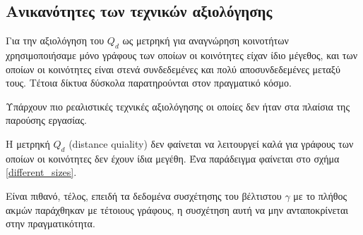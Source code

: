 \documentclass[12pt, letterpaper]{article}
\begin{document}
\subsection{Ανικανότητες των τεχνικών αξιολόγησης}

Για την αξιολόγηση του $Q_d$ ως μετρηκή για αναγνώρηση κοινοτήτων χρησιμοποιήσαμε 
μόνο γράφους των οποίων οι κοινότητες είχαν ίδιο μέγεθος, και των οποίων οι κοινότητες 
είναι στενά συνδεδεμένες και πολύ αποσυνδεδεμένες μεταξύ τους. 
Τέτοια δίκτυα δύσκολα παρατηρούνται στον πραγματικό κόσμο. 

Υπάρχουν πιο ρεαλιστικές τεχνικές αξιολόγησης \cite{benchmark_realistic} οι οποίες δεν 
ήταν στα πλαίσια της παρούσης εργασίας. 


Η μετρηκή $Q_d$ (\textlatin{distance quiality}) δεν φαίνεται να λειτουργεί καλά για γράφους
των οποίων οι κοινότητες δεν έχουν ίδια μεγέθη. 
Ένα παράδειγμα φαίνεται στο σχήμα \ref{different_sizes}.  

Είναι πιθανό, τέλος, επειδή τα δεδομένα συσχέτησης του βέλτιστου $\gamma$ με το πλήθος 
ακμών παράχθηκαν με τέτοιους γράφους, η συσχέτηση αυτή να μην ανταποκρίνεται στην πραγματικότητα. 
\end{document}
